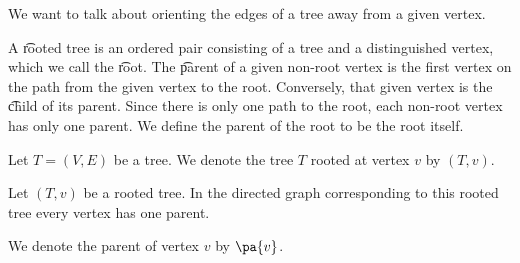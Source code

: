 

We want to talk about orienting the edges of a tree away from a given vertex.


A \t{rooted tree} is an ordered pair consisting of a tree and a distinguished vertex, which we call the \t{root}.
The \t{parent} of a given non-root vertex is the first vertex on the path from the given vertex to the root.
Conversely, that given vertex is the \t{child} of its parent.
Since there is only one path to the root, each non-root vertex has only one parent.
We define the parent of the root to be the root itself.

%

Let $T = (V, E)$ be a tree.
We denote the tree $T$ rooted at vertex $v$ by $(T, v)$.


\begin{prop}
Let $(T, v)$ be a rooted tree.
In the directed graph corresponding to this rooted tree every vertex has one parent.
\end{prop}

We denote the parent of vertex $v$ by $\pa{v}$.
